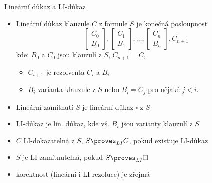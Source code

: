 \documentclass{beamer}
\begin{document}
\begin{frame}{Lineární důkaz a LI-důkaz}

    \begin{itemize}[<+->]
        \item \alert{Lineární důkaz} klauzule $C$ z formule $S$ je konečná posloupnost
        $$
        \begin{bmatrix}
            C_0 \\
            B_0
        \end{bmatrix},
        \begin{bmatrix}
            C_1 \\
            B_1
        \end{bmatrix},\dots,
        \begin{bmatrix}
            C_n \\
            B_n
        \end{bmatrix},
        C_{n+1}
        $$
        kde: $B_0$ a $C_0$ jsou  klauzulí z $S$, $C_{n+1}=C$,
        \begin{itemize}
            \item $C_{i+1}$ je rezolventa $C_i$ a $B_i$
            \item $B_i$ \alert{varianta} klauzule z $S$ nebo $B_i=C_j$ pro nějaké $j<i$.
        \end{itemize}
        \item \alert{Lineární zamítnutí} $S$ je lineární důkaz $\square$ z $S$
        
        \item \alert{LI-důkaz} je lin. důkaz, kde vš. $B_i$ jsou varianty klauzulí z $S$
        \item $C$ \alert{LI-dokazatelná} z $S$, \alert{$S\proves_{LI}C$}, pokud existuje LI-důkaz
        \item $S$ je \alert{LI-zamítnutelná}, pokud $S\proves_{LI}\square$    
        \item korektnost (lineární i LI-rezoluce) je zřejmá
    \end{itemize}

    
\end{frame}
\end{document}
